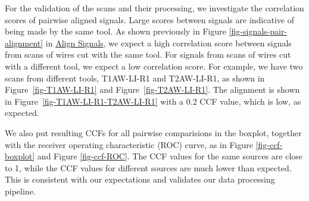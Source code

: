 \documentclass[fleqn,10pt]{wlscirep}
\begin{document}
\begin{table}

\caption{\label{tbl-CCF-replicate-staging-acquisition}Comparison of CCF across different settings.}


\end{table}%

For the validation of the scans and their processing, we investigate the
correlation scores of pairwise aligned signals. Large scores between
signals are indicative of being made by the same tool. As shown
previously in Figure \ref{fig-signals-pair-alignment} in
\hyperref[sec-align-signals]{Align Signals}, we expect a high
correlation score between signals from scans of wires cut with the same
tool. For signals from scans of wires cut with a different tool, we
expect a low correlation score. For example, we have two scans from
different tools, T1AW-LI-R1 and T2AW-LI-R1, as shown in
Figure~\ref{fig-T1AW-LI-R1} and Figure~\ref{fig-T2AW-LI-R1}. The
alignment is shown in Figure~\ref{fig-T1AW-LI-R1-T2AW-LI-R1} with a 0.2
CCF value, which is low, as expected.

We also put resulting CCFs for all pairwise comparisions in the boxplot,
together with the receiver operating characteristic (ROC) curve, as in
Figure \ref{fig-ccf-boxplot} and Figure \ref{fig-ccf-ROC}. The CCF
values for the same sources are close to 1, while the CCF values for
different sources are much lower than expected. This is consistent with
our expectations and validates our data processing pipeline.
\end{document}
